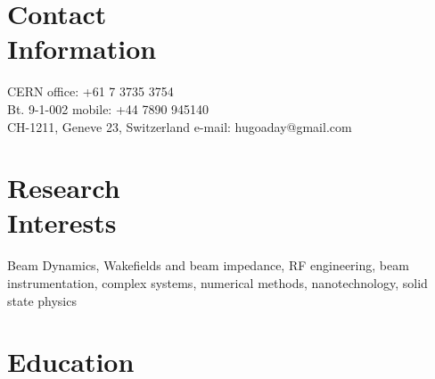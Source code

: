 \documentclass[margin,line]{resume}
\begin{document}
\begin{resume}

    \section{\mysidestyle Contact\\Information}

    CERN                            \hfill office: +61 7 3735 3754          \vspace{0mm}\\\vspace{0mm}%
    Bt. 9-1-002                          \hfill mobile: +44 7890 945140          \vspace{0mm}\\\vspace{0mm}%
    CH-1211, Geneve 23, Switzerland      \hfill e-mail: hugoaday@gmail.com  \vspace{0mm}\\\vspace{-4.5mm}%


    \section{\mysidestyle Research\\Interests}

Beam Dynamics, Wakefields and beam impedance, RF engineering, beam instrumentation, complex systems, numerical methods, nanotechnology, solid state physics


    \section{\mysidestyle Education}


\end{resume}
\end{document}
